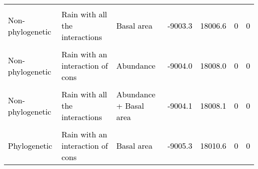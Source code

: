 \documentclass[
  12pt,
  letterpaper,
  DIV=11,
  numbers=noendperiod]{scrartcl}
\begin{document}
\begin{table}[H]
{\begin{tabular}[t]{lllllll}
\cellcolor{gray!6}{\textcolor{black}{Phylogenetic}} & \cellcolor{gray!6}{\textcolor{black}{Rain with all the interactions}} & \cellcolor{gray!6}{\textcolor{black}{Basal area}} & \cellcolor{gray!6}{\textcolor{black}{-9003.3}} & \cellcolor{gray!6}{\textcolor{black}{18006.6}} & \cellcolor{gray!6}{\textcolor{black}{0}} & \cellcolor{gray!6}{\textcolor{black}{0}}\\
\addlinespace
\textcolor{black}{Non-phylogenetic} & \textcolor{black}{Rain with all the interactions} & \textcolor{black}{Basal area} & \textcolor{black}{-9003.3} & \textcolor{black}{18006.6} & \textcolor{black}{0} & \textcolor{black}{0}\\
\cellcolor{gray!6}{\textcolor{black}{Phylogenetic}} & \cellcolor{gray!6}{\textcolor{black}{Rain with an interaction of cons}} & \cellcolor{gray!6}{\textcolor{black}{Abundance}} & \cellcolor{gray!6}{\textcolor{black}{-9003.7}} & \cellcolor{gray!6}{\textcolor{black}{18007.4}} & \cellcolor{gray!6}{\textcolor{black}{0}} & \cellcolor{gray!6}{\textcolor{black}{0}}\\
\textcolor{black}{Non-phylogenetic} & \textcolor{black}{Rain with an interaction of cons} & \textcolor{black}{Abundance} & \textcolor{black}{-9004.0} & \textcolor{black}{18008.0} & \textcolor{black}{0} & \textcolor{black}{0}\\
\cellcolor{gray!6}{\textcolor{black}{Phylogenetic}} & \cellcolor{gray!6}{\textcolor{black}{Rain with all the interactions}} & \cellcolor{gray!6}{\textcolor{black}{Abundance + Basal area}} & \cellcolor{gray!6}{\textcolor{black}{-9004.0}} & \cellcolor{gray!6}{\textcolor{black}{18008.1}} & \cellcolor{gray!6}{\textcolor{black}{0}} & \cellcolor{gray!6}{\textcolor{black}{0}}\\
\textcolor{black}{Non-phylogenetic} & \textcolor{black}{Rain with all the interactions} & \textcolor{black}{Abundance + Basal area} & \textcolor{black}{-9004.1} & \textcolor{black}{18008.1} & \textcolor{black}{0} & \textcolor{black}{0}\\
\addlinespace
\cellcolor{gray!6}{\textcolor{black}{Non-phylogenetic}} & \cellcolor{gray!6}{\textcolor{black}{Rain without interactions}} & \cellcolor{gray!6}{\textcolor{black}{Abundance}} & \cellcolor{gray!6}{\textcolor{black}{-9005.1}} & \cellcolor{gray!6}{\textcolor{black}{18010.3}} & \cellcolor{gray!6}{\textcolor{black}{0}} & \cellcolor{gray!6}{\textcolor{black}{0}}\\
\textcolor{black}{Phylogenetic} & \textcolor{black}{Rain with an interaction of cons} & \textcolor{black}{Basal area} & \textcolor{black}{-9005.3} & \textcolor{black}{18010.6} & \textcolor{black}{0} & \textcolor{black}{0}\\

\end{tabular}}
\end{table}
\end{document}
